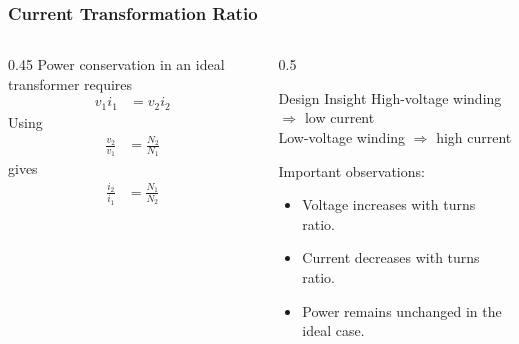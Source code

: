 \begin{frame}
    \frametitle{Current Transformation Ratio}
    \begin{columns}
        \begin{column}{0.45\textwidth}
            Power conservation in an ideal transformer requires
            \begin{align}
                v_1 i_1 &= v_2 i_2
            \end{align}
            Using
            \begin{align}
                \frac{v_2}{v_1} &= \frac{N_2}{N_1}
            \end{align}
            gives
            \begin{align}
                \frac{i_2}{i_1} &= \frac{N_1}{N_2}
            \end{align}
        \end{column}
        \begin{column}{0.5\textwidth}
            \begin{block}{Design Insight}
                High-voltage winding $\Rightarrow$ low current \\
                Low-voltage winding $\Rightarrow$ high current
            \end{block}
            Important observations:
            \begin{itemize}
                \item Voltage increases with turns ratio.
                \item Current decreases with turns ratio.
                \item Power remains unchanged in the ideal case.
            \end{itemize}
        \end{column}
    \end{columns}
\end{frame}



